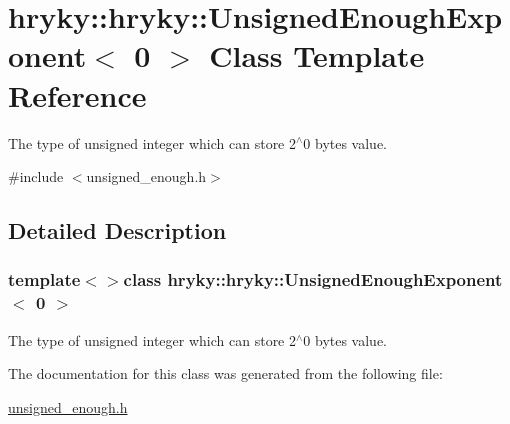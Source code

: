 \hypertarget{classhryky_1_1hryky_1_1_unsigned_enough_exponent_3_010_01_4}{\section{hryky\-:\-:hryky\-:\-:Unsigned\-Enough\-Exponent$<$ 0 $>$ Class Template Reference}
\label{classhryky_1_1hryky_1_1_unsigned_enough_exponent_3_010_01_4}
}


The type of unsigned integer which can store 2$^\wedge$0 bytes value.  




{\ttfamily \#include $<$unsigned\-\_\-enough.\-h$>$}



\subsection{Detailed Description}
\subsubsection*{template$<$$>$class hryky\-::hryky\-::\-Unsigned\-Enough\-Exponent$<$ 0 $>$}

The type of unsigned integer which can store 2$^\wedge$0 bytes value. 

The documentation for this class was generated from the following file\-:\begin{DoxyCompactItemize}
\item 
\hyperlink{unsigned__enough_8h}{unsigned\-\_\-enough.\-h}\end{DoxyCompactItemize}
